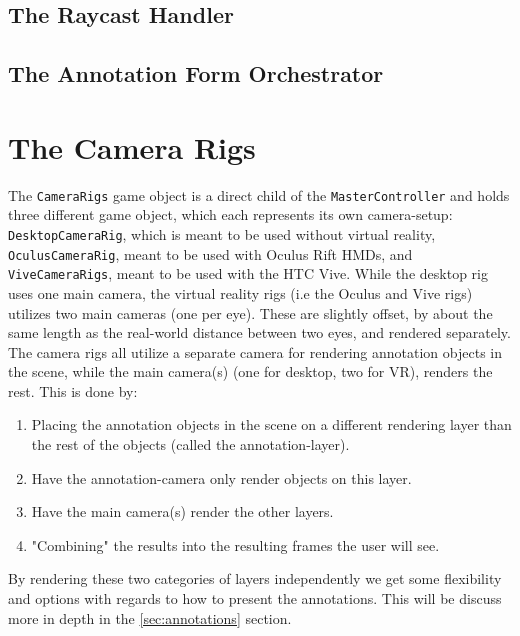 \subsection{The Raycast Handler}

\subsection{The Annotation Form Orchestrator}



\section{The Camera Rigs}
The \texttt{CameraRigs} game object is a direct child of the \texttt{MasterController} and holds three different game object, 
which each represents its own camera-setup: \texttt{DesktopCameraRig}, which is meant to be used
without virtual reality, \texttt{OculusCameraRig}, meant to be used with Oculus Rift HMDs, and \texttt{ViveCameraRigs}, meant to be used with the HTC Vive. 
While the desktop rig uses one main camera, the virtual reality rigs (i.e the Oculus and Vive rigs) utilizes two main cameras (one per eye).
These are slightly offset, by about the same length as the real-world distance between two eyes, and rendered separately.
The camera rigs all utilize a separate camera for rendering annotation objects in the scene, while the main camera(s) (one for desktop, two for VR), 
renders the rest. This is done by:

\begin{enumerate}
	\item Placing the annotation objects in the scene on a different rendering layer than the rest of the objects (called the annotation-layer).
	\item Have the annotation-camera only render objects on this layer.
	\item Have the main camera(s) render the other layers.
	\item "Combining" the results into the resulting frames the user will see.
\end{enumerate}

By rendering these two categories of layers independently we get some flexibility and options with regards to how to present the annotations.
This will be discuss more in depth in the \ref{sec:annotations} section.

